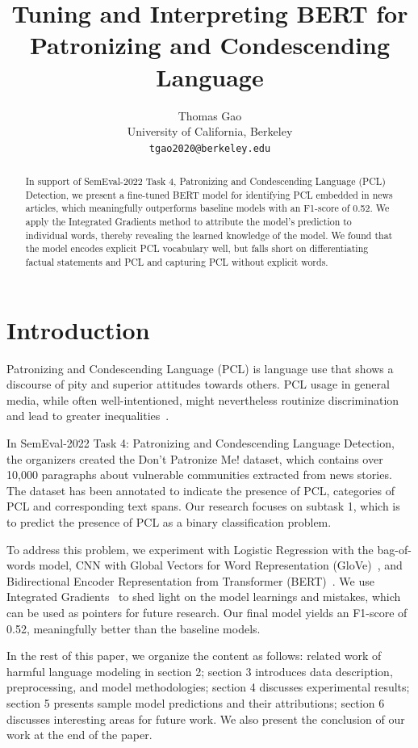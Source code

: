 \documentclass[11pt]{article}
\title{Tuning and Interpreting BERT for Patronizing and Condescending Language}
\author{Thomas Gao \\
  University of California, Berkeley \\
  \texttt{tgao2020@berkeley.edu} \\}
\begin{document}
\maketitle
\begin{abstract}
In support of SemEval-2022 Task 4, Patronizing and Condescending Language (PCL) Detection, we present a fine-tuned BERT model for identifying PCL embedded in news articles, which meaningfully outperforms baseline models with an F1-score of 0.52. We apply the Integrated Gradients method to attribute the model’s prediction to individual words, thereby revealing the learned knowledge of the model. We found that the model encodes explicit PCL vocabulary well, but falls short on differentiating factual statements and PCL and capturing PCL without explicit words.
\end{abstract}

\section{Introduction}

Patronizing and Condescending Language (PCL) is language use that shows a discourse of pity and superior attitudes towards others. PCL usage in general media, while often well-intentioned, might nevertheless routinize discrimination and lead to greater inequalities~\cite{perez2020don}.

In SemEval-2022 Task 4: Patronizing and Condescending Language Detection, the organizers created the Don’t Patronize Me! dataset, which contains over 10,000 paragraphs about vulnerable communities extracted from news stories. The dataset has been annotated to indicate the presence of PCL, categories of PCL and corresponding text spans. Our research focuses on subtask 1, which is to predict the presence of PCL as a binary classification problem.

To address this problem, we experiment with Logistic Regression with the bag-of-words model, CNN with Global Vectors for Word Representation (GloVe)~\cite{pennington2014glove}, and Bidirectional Encoder Representation from Transformer (BERT)~\cite{devlin2018bert}. We use Integrated Gradients~\cite{sundararajan2017axiomatic} to shed light on the model learnings and mistakes, which can be used as pointers for future research. Our final model yields an F1-score of 0.52, meaningfully better than the baseline models.

In the rest of this paper, we organize the content as follows: related work of harmful language modeling in section 2; section 3 introduces data description, preprocessing, and model methodologies; section 4 discusses experimental results; section 5 presents sample model predictions and their attributions; section 6 discusses interesting areas for future work. We also present the conclusion of our work at the end of the paper.
\end{document}

